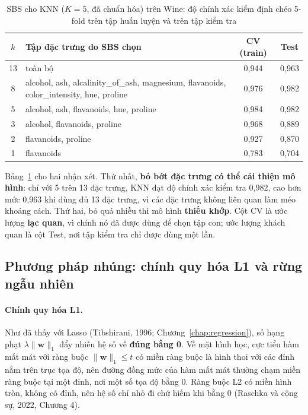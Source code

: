 \begin{table}[H]
\centering
\small
\begin{tabular}{|c|p{7.6cm}|c|c|}
\hline
\textbf{$k$} & \textbf{Tập đặc trưng do SBS chọn} & \textbf{CV (train)} & \textbf{Test} \\
\hline
13 & toàn bộ & 0,944 & 0,963 \\ \hline
8 & alcohol, ash, alcalinity\_of\_ash, magnesium, flavanoids, color\_intensity, hue, proline & 0,976 & 0,982 \\ \hline
5 & alcohol, ash, flavanoids, hue, proline & 0,984 & 0,982 \\ \hline
3 & alcohol, flavanoids, proline & 0,968 & 0,889 \\ \hline
2 & flavanoids, proline & 0,927 & 0,870 \\ \hline
1 & flavanoids & 0,783 & 0,704 \\ \hline
\end{tabular}
\caption{SBS cho KNN ($K = 5$, đã chuẩn hóa) trên Wine: độ chính xác kiểm định chéo 5-fold trên tập huấn luyện và trên tập kiểm tra}
\label{tab:sbs-wine}
\end{table}

Bảng~\ref{tab:sbs-wine} cho hai nhận xét. Thứ nhất, \textbf{bỏ bớt đặc trưng có thể cải thiện mô hình}: chỉ với 5 trên 13 đặc trưng, KNN đạt độ chính xác kiểm tra 0,982, cao hơn mức 0,963 khi dùng đủ 13 đặc trưng, vì các đặc trưng không liên quan làm méo khoảng cách. Thứ hai, bỏ quá nhiều thì mô hình \textbf{thiếu khớp}. Cột CV là ước lượng \textbf{lạc quan}, vì chính nó đã được dùng để chọn tập con; ước lượng khách quan là cột Test, nơi tập kiểm tra chỉ được dùng một lần.

\subsection{Phương pháp nhúng: chính quy hóa L1 và rừng ngẫu nhiên}

\paragraph{Chính quy hóa L1.} Như đã thấy với Lasso (Tibshirani, 1996; Chương~\ref{chap:regression}), số hạng phạt $\lambda\|\mathbf{w}\|_1$ đẩy nhiều hệ số về \textbf{đúng bằng 0}. Về mặt hình học, cực tiểu hàm mất mát với ràng buộc $\|\mathbf{w}\|_1 \leq t$ có miền ràng buộc là hình thoi với các đỉnh nằm trên trục tọa độ, nên đường đồng mức của hàm mất mát thường chạm miền ràng buộc tại một đỉnh, nơi một số tọa độ bằng 0. Ràng buộc L2 có miền hình tròn, không có đỉnh, nên hệ số chỉ nhỏ đi chứ hiếm khi bằng 0 (Raschka và cộng sự, 2022, Chương 4).

